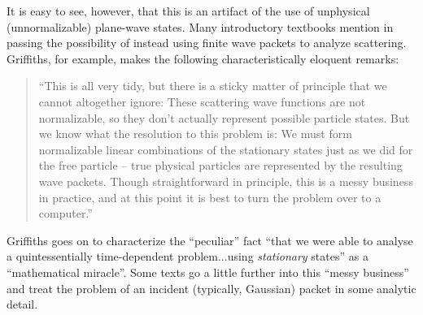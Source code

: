 \documentclass[aps,prc,twocolumn,letterpaper,floatfix]{revtex4}
\begin{document}
It is easy to see, however, that this is an artifact of the use of unphysical
(unnormalizable) plane-wave states.  Many introductory textbooks mention in
passing the possibility of instead using finite wave packets to
analyze scattering. \cite{townsend}  Griffiths, for example, makes
the following characteristically eloquent remarks:
\begin{quote}
``This is all very tidy, but there is a sticky matter of principle
that we cannot altogether ignore:  These scattering wave functions are
not normalizable, so they don't actually represent possible particle
states.  But we know what the resolution to this problem is: We must
form normalizable linear combinations of the stationary states just as
we did for the free particle -- true physical particles are
represented by the resulting wave packets.  Though straightforward in
principle, this is a messy business in practice, and at this point it
is best to turn the problem over to a computer.'' \cite{griffiths}
\end{quote}
Griffiths goes on to characterize the ``peculiar''
fact ``that we were able to analyse a quintessentially time-dependent
problem...using \emph{stationary} states'' as a ``mathematical
miracle''. 
Some texts go a little further into this ``messy business'' and treat 
the problem of an incident
(typically, Gaussian) packet in some analytic detail. \cite{shankar}
\end{document}
